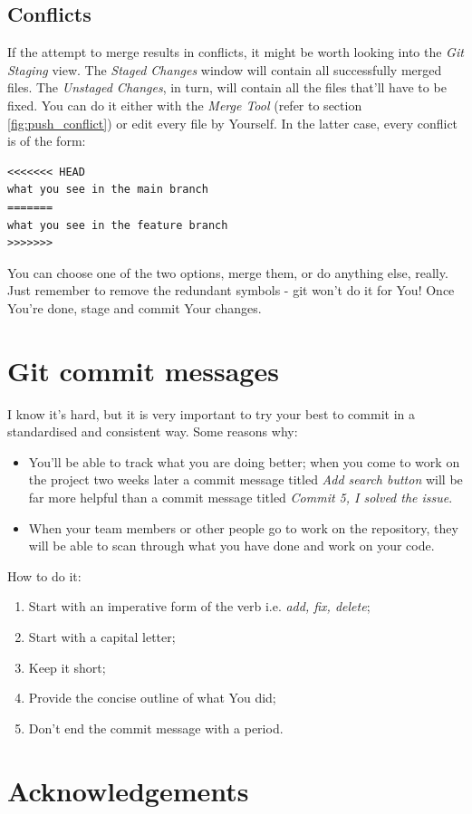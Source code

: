 \documentclass{article}
\begin{document}
\subsection{Conflicts}
\label{sec:conflicts}

If the attempt to merge results in conflicts, it might be worth looking into the \textit{Git Staging} view. The \textit{Staged Changes} window will contain all successfully merged files. The \textit{Unstaged Changes}, in turn, will contain all the files that'll have to be fixed. You can do it either with the \textit{Merge Tool} (refer to section \ref{fig:push_conflict}) or edit every file by Yourself. In the latter case, every conflict is of the form:
\begin{verbatim}
<<<<<<< HEAD
what you see in the main branch
=======
what you see in the feature branch
>>>>>>>
\end{verbatim}
You can choose one of the two options, merge them, or do anything else, really. Just remember to remove the redundant symbols - git won't do it for You! Once You're done, stage and commit Your changes.


\section{Git commit messages}
\label{sec:commit_messages}
I know it's hard, but it is very important to try your best to commit in a standardised and consistent way. Some reasons why: 
\begin{itemize}
    \item You'll be able to track what you are doing better; when you come to work on the project two weeks later a commit message titled \textit{Add search button} will be far more helpful than a commit message titled \textit{Commit 5, I solved the issue}.
    \item When your team members or other people go to work on the repository, they will be able to scan through what you have done and work on your code. 
\end{itemize}

How to do it: 
\begin{enumerate}
    \item Start with an imperative form of the verb i.e. \textit{add, fix, delete};
    \item Start with a capital letter; 
    \item Keep it short;
    \item Provide the concise outline of what You did;
    \item Don't end the commit message with a period. 
\end{enumerate}

\section{Acknowledgements}
\end{document}

